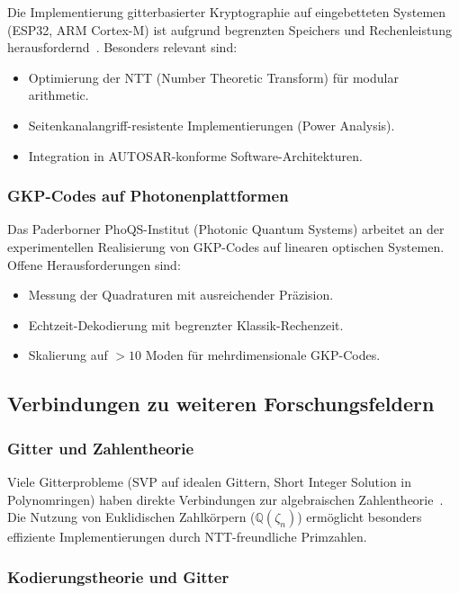 ﻿\documentclass[a4paper,12pt]{article}
\theoremstyle{definition}
\begin{document}
Die Implementierung gitterbasierter Kryptographie auf eingebetteten Systemen
(ESP32, ARM Cortex-M) ist aufgrund begrenzten Speichers und Rechenleistung
herausfordernd~\cite{Epp2026Embedded}.
Besonders relevant sind:
\begin{itemize}
    \item Optimierung der NTT (Number Theoretic Transform) für modular arithmetic.
    \item Seitenkanalangriff-resistente Implementierungen (Power Analysis).
    \item Integration in AUTOSAR-konforme Software-Architekturen.
\end{itemize}

\subsubsection{GKP-Codes auf Photonenplattformen}

Das Paderborner PhoQS-Institut (Photonic Quantum Systems) arbeitet an der
experimentellen Realisierung von GKP-Codes auf linearen optischen Systemen.
Offene Herausforderungen sind:
\begin{itemize}
    \item Messung der Quadraturen mit ausreichender Präzision.
    \item Echtzeit-Dekodierung mit begrenzter Klassik-Rechenzeit.
    \item Skalierung auf $>10$ Moden für mehrdimensionale GKP-Codes.
\end{itemize}

\subsection{Verbindungen zu weiteren Forschungsfeldern}

\subsubsection{Gitter und Zahlentheorie}

Viele Gitterprobleme (SVP auf idealen Gittern, Short Integer Solution in Polynomringen)
haben direkte Verbindungen zur algebraischen Zahlentheorie~\cite{PeikertRosen2007}.
Die Nutzung von Euklidischen Zahlkörpern ($\mathbb{Q}(\zeta_n)$) ermöglicht
besonders effiziente Implementierungen durch NTT-freundliche Primzahlen.

\subsubsection{Kodierungstheorie und Gitter}
\end{document}
